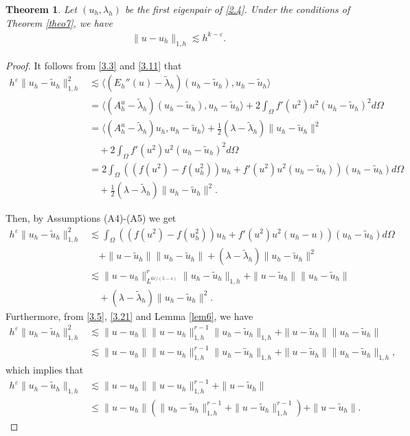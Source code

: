 \documentclass[compress, preprint,9pt]{elsarticle}
\numberwithin{equation}{section}
\newtheorem{theo}{Theorem}[section]
\newcommand{\eps}{\varepsilon}
\newcommand{\la}{\langle}
\newcommand{\ran}{\rangle}
\begin{document}
\begin{theo}\label{lem9}
	Let $(u_h,\lambda_h)$ be the first eigenpair of \eqref{2.4}. Under the conditions of Theorem \ref{theo7}, we have
	\begin{eqnarray*}
		\|u-u_h\|_{1,h}\lesssim h^{k-\eps}.
	\end{eqnarray*}
\end{theo}
\begin{proof}
	It follows from \eqref{3.3} and \eqref{3.11} that
	\begin{eqnarray*}
		h^\eps\|u_h-\widetilde{u}_h\|_{1,h}^2&\lesssim \la (E_h''(u)-\widetilde{\lambda}_h)(u_h-\widetilde{u}_h),u_h-\widetilde{u}_h\ran\\
		&=\la (A_h^u-\widetilde{\lambda}_h)(u_h-\widetilde{u}_h),u_h-\widetilde{u}_h\ran+2\int_\Omega f'(u^2)u^2(u_h-\widetilde{u}_h)^2d\Omega\\
		&=\la (A_h^u-\widetilde{\lambda}_h)u_h,u_h-\widetilde{u}_h\ran+\frac12(\lambda-\widetilde{\lambda}_h)\|u_h-\widetilde{u}_h\|^2\\
		&\quad+2\int_\Omega f'(u^2)u^2(u_h-\widetilde{u}_h)^2d\Omega\\
		&=2\int_\Omega \left((f(u^2)-f(u_h^2))u_h+f'(u^2)u^2(u_h-\widetilde{u}_h)\right)(u_h-\widetilde{u}_h)d\Omega\\
		&\quad+\frac12(\lambda-\widetilde{\lambda}_h)\|u_h-\widetilde{u}_h\|^2.
	\end{eqnarray*}
	
	Then, by Assumptions (A4)-(A5) we get
	\begin{eqnarray*}
		h^\eps\|u_h-\widetilde{u}_h\|_{1,h}^2&\lesssim \int_\Omega \left((f(u^2)-f(u_h^2))u_h+f'(u^2)u^2(u_h-u)\right)(u_h-\widetilde{u}_h)d\Omega\\
		&\quad+\|u-\widetilde{u}_h\|\|u_h-\widetilde{u}_h\|+(\lambda-\widetilde{\lambda}_h)\|u_h-\widetilde{u}_h\|^2\\
		&\lesssim \|u-u_h\|_{L^{6r/(5-s)}}^r\|u_h-\widetilde{u}_h\|_{1,h}+\|u-\widetilde{u}_h\|\|u_h-\widetilde{u}_h\|\\
		&\quad+(\lambda-\widetilde{\lambda}_h)\|u_h-\widetilde{u}_h\|^2.
	\end{eqnarray*}
	Furthermore, from \eqref{3.5}, \eqref{3.21} and Lemma \ref{lem6}, we have
	\begin{eqnarray*}
		h^\eps\|u_h-\widetilde{u}_h\|_{1,h}^2&\lesssim \|u-u_h\|\|u-u_h\|_{1,h}^{r-1}\|u_h-\widetilde{u}_h\|_{1,h}+\|u-\widetilde{u}_h\|\|u_h-\widetilde{u}_h\|\\
		&\lesssim\|u-u_h\|\|u-u_h\|_{1,h}^{r-1}\|u_h-\widetilde{u}_h\|_{1,h}+\|u-\widetilde{u}_h\|\|u_h-\widetilde{u}_h\|_{1,h},
	\end{eqnarray*}
	which implies that
	\begin{eqnarray*}
		h^\eps\|u_h-\widetilde{u}_h\|_{1,h}&\lesssim\|u-u_h\|\|u-u_h\|_{1,h}^{r-1}+\|u-\widetilde{u}_h\|\\
		&\le\|u-u_h\|\left(\|u_h-\widetilde{u}_h\|_{1,h}^{r-1}+\|u-\widetilde{u}_h\|_{1,h}^{r-1}\right)+\|u-\widetilde{u}_h\|.
	\end{eqnarray*}
	

\end{proof}
\end{document}
